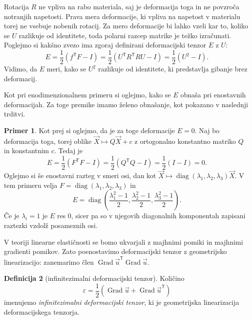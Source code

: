 \documentclass[12pt,a4paper]{article}
\theoremstyle{definition} %
\newtheorem{definicija}{Definicija}[section]
\newtheorem{primer}[definicija]{Primer}
\theoremstyle{plain} %
\newtheorem{trditev}[definicija]{Trditev}
\numberwithin{equation}{section}
\newcommand{\T}{\mathsf{T}}
\newcommand{\Grad}{\operatorname{Grad}}
\newcommand{\eps}{\varepsilon}
\newcommand{\vv}{\vec{v}}
\newcommand{\vu}{\vec{u}}
\newcommand{\va}{\vec{a}}
\newcommand{\vb}{\vec{b}}
\newcommand{\vX}{\vec{X}}
\DeclareMathOperator{\diag}{diag}
\begin{document}
Rotacija $R$ ne vpliva na rabo materiala, saj je deformacija toga in ne povzroča
notranjih napetosti. Prava mera deformacije, ki vpliva na napetost v materialu
torej ne vsebuje nobenih rotacij. Za mero deformacije bi lahko vzeli kar to,
koliko se $U$ razlikuje od identitete, toda polarni razcep matrike je težko
izračunati. Poglejmo si kakšno zvezo ima zgoraj definirani deformacijski tenzor
$E$ z $U$:
\[
  E = \frac12(f^\T F - I) = \frac12(U^\T R^\T R U - I) = \frac12 (U^2 - I).
\]
Vidimo, da $E$ meri, kako se $U^2$ razlikuje od identitete, ki predstavlja
gibanje brez deformacij.

Kot pri enodimenzionalnem primeru si oglejmo, kako se $E$ obnaša pri enostavnih
deformacijah. Za toge premike imamo želeno obnašanje, kot pokazano v naslednji
trditvi.

\begin{primer}
  Kot prej si oglejmo, da je za toge deformacije $E = 0$.
 Naj bo deformacija toga, torej oblike $\vX \mapsto Q\vX +
c$ z ortogonalno konstantno matriko $Q$ in konstantnim $c$. Tedaj je
\[ E = \frac12 (F^\T F - I) = \frac12(Q^\T Q - I) = \frac12(I - I) = 0. \]
Oglejmo si še enostavni razteg v smeri osi, dan kot
$\vX \mapsto \diag(\lambda_1, \lambda_2, \lambda_3) \vX$.
V tem primeru velja $F = \diag(\lambda_1, \lambda_2, \lambda_3)$ in
  \[
    E = \diag\left(
      \frac{\lambda_1^2-1}{2},
      \frac{\lambda_2^2-1}{2},
      \frac{\lambda_3^2-1}{2}
    \right).
  \]
  Če je $\lambda_i = 1$ je $E$ res 0, sicer pa so v njegovih diagonalnih
  komponentah zapisani raztezki vzdolž posameznih osi.
\end{primer}

V teoriji linearne elastičnosti se bomo ukvarjali z majhnimi pomiki in majhnimi
gradienti pomikov. Zato poenostavimo deformacijski tenzor z geometrijsko
linearizacijo: zanemarimo člen $\Grad \vu^\T \Grad \vu$.

\begin{definicija}[infinitezimalni deformacijski tenzor]
  Količino
  \begin{equation}
    \eps = \frac{1}{2}(\Grad \vu + \Grad \vu^\T)
    \label{eq:eps}
  \end{equation}
  imenujemo \emph{infinitezimalni deformacijski tenzor}, ki je geometrijska
  linearizacija deformacijskega tenzorja.
\end{definicija}

\end{document}
